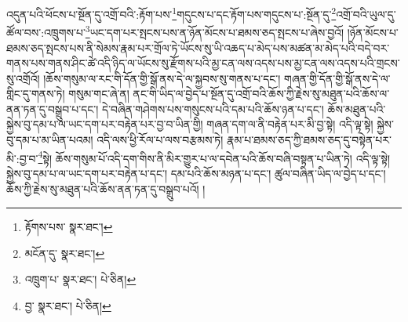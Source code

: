 འདུན་པའི་ཕོངས་པ་སྔོན་དུ་འགྲོ་བའི་:རྟོག་པས་\footnote{རྟོགས་པས་  སྣར་ཐང་། }གདུངས་པ་དང་རྟོག་པས་གདུངས་པ་:སྔོན་དུ་\footnote{མངོན་དུ་  སྣར་ཐང་། }འགྲོ་བའི་ཡུལ་དུ་ཚོལ་བས་:འཁྲུགས་པ་\footnote{འཁྲུག་པ་  སྣར་ཐང་།  པེ་ཅིན། }ཡང་དག་པར་སྤངས་པས་ན་ཉོན་མོངས་པ་ཐམས་ཅད་སྤངས་པ་ཞེས་བྱའོ། །ཉོན་མོངས་པ་ཐམས་ཅད་སྤངས་པས་ནི་སེམས་རྣམ་པར་གྲོལ་ཏེ་ཡོངས་སུ་ཡི་འཆད་པ་མེད་པས་མཚན་མ་མེད་པའི་བདེ་བར་གནས་པས་གནས་ཤིང་ཚེ་འདི་ཉིད་ལ་ཡོངས་སུ་རྫོགས་པའི་མྱ་ངན་ལས་འདས་པས་མྱ་ངན་ལས་འདས་པའི་གྲངས་སུ་འགྲོའོ། །ཆོས་གསུམ་ལ་རང་གི་དོན་གྱི་སྒོ་ནས་དེ་ལ་སྐྱབས་སུ་གནས་པ་དང་། གཞན་གྱི་དོན་གྱི་སྒོ་ནས་དེ་ལ་གླིང་དུ་གནས་ཏེ། གསུམ་གང་ཞེ་ན། ནང་གི་ཡིད་ལ་བྱེད་པ་སྔོན་དུ་འགྲོ་བའི་ཆོས་ཀྱི་རྗེས་སུ་མཐུན་པའི་ཆོས་ལ་ནན་ཏན་དུ་བསྒྲུབ་པ་དང་། དེ་བཞིན་གཤེགས་པས་གསུངས་པའི་དམ་པའི་ཆོས་ཉན་པ་དང་། ཆོས་མཐུན་པའི་སྐྱེས་བུ་དམ་པ་ལ་ཡང་དག་པར་བརྟེན་པར་བྱ་བ་ཡིན་གྱི། གཞན་དག་ལ་ནི་བརྟེན་པར་མི་བྱ་སྟེ། འདི་ལྟ་སྟེ། སྐྱེས་བུ་དམ་པ་མ་ཡིན་པའམ། འདི་ལས་ཕྱི་རོལ་པ་ལས་བརྩམས་ཏེ། རྣམ་པ་ཐམས་ཅད་ཀྱི་ཐམས་ཅད་དུ་བསྟེན་པར་མི་:བྱ་བ་\footnote{བྱ་  སྣར་ཐང་།  པེ་ཅིན། }སྟེ། ཆོས་གསུམ་པོ་འདི་དག་གིས་ནི་མིར་གྱུར་པ་ལ་དབེན་པའི་ཆོས་བཞི་བསྟན་པ་ཡིན་ཏེ། འདི་ལྟ་སྟེ། སྐྱེས་བུ་དམ་པ་ལ་ཡང་དག་པར་བརྟེན་པ་དང་། དམ་པའི་ཆོས་མཉན་པ་དང་། ཚུལ་བཞིན་ཡིད་ལ་བྱེད་པ་དང་། ཆོས་ཀྱི་རྗེས་སུ་མཐུན་པའི་ཆོས་ནན་ཏན་དུ་བསྒྲུབ་པའོ། །
